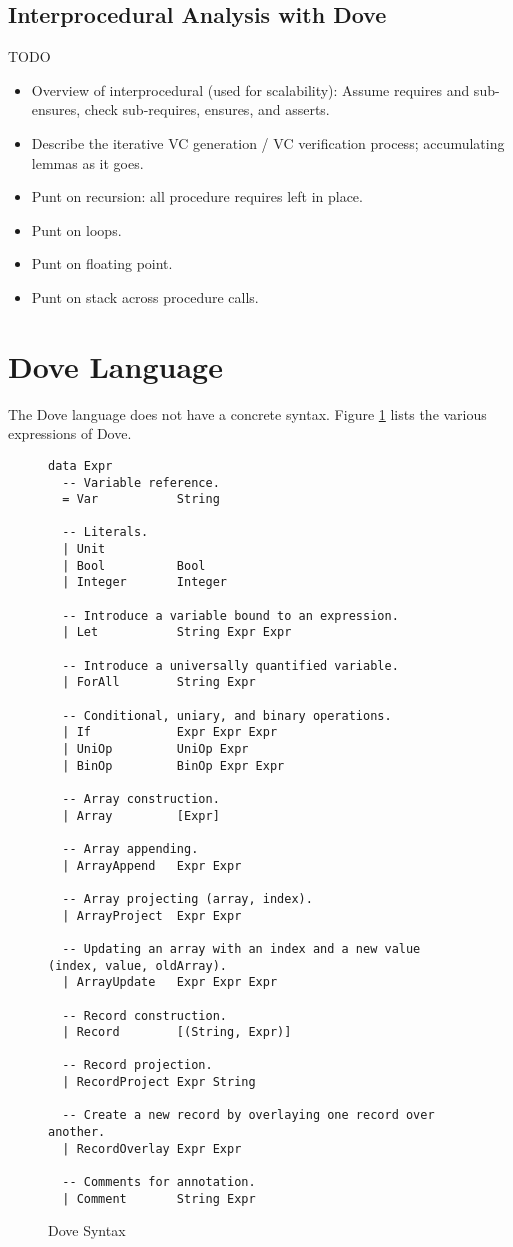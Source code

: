 \documentclass{article}
\begin{document}
\subsection{Interprocedural Analysis with Dove}
TODO
\begin{itemize}
  \item Overview of interprocedural (used for scalability): Assume requires and sub-ensures, check sub-requires, ensures, and asserts.
  \item Describe the iterative VC generation / VC verification process; accumulating lemmas as it goes.
  \item Punt on recursion: all procedure requires left in place.
  \item Punt on loops.
  \item Punt on floating point.
  \item Punt on stack across procedure calls.
\end{itemize}

\section{Dove Language}
The Dove language does not have a concrete syntax.  Figure \ref{doveSyntax} lists the various expressions of Dove.


\begin{figure}
  \caption{Dove Syntax}
  \label{doveSyntax}
  \begin{lstlisting}
data Expr
  -- Variable reference.
  = Var           String

  -- Literals.
  | Unit
  | Bool          Bool
  | Integer       Integer

  -- Introduce a variable bound to an expression.
  | Let           String Expr Expr

  -- Introduce a universally quantified variable.
  | ForAll        String Expr

  -- Conditional, uniary, and binary operations.
  | If            Expr Expr Expr
  | UniOp         UniOp Expr
  | BinOp         BinOp Expr Expr

  -- Array construction.
  | Array         [Expr]

  -- Array appending.
  | ArrayAppend   Expr Expr

  -- Array projecting (array, index).
  | ArrayProject  Expr Expr

  -- Updating an array with an index and a new value (index, value, oldArray).
  | ArrayUpdate   Expr Expr Expr

  -- Record construction.
  | Record        [(String, Expr)]

  -- Record projection.
  | RecordProject Expr String

  -- Create a new record by overlaying one record over another.
  | RecordOverlay Expr Expr

  -- Comments for annotation.
  | Comment       String Expr
  \end{lstlisting}
\end{figure}
\end{document}

